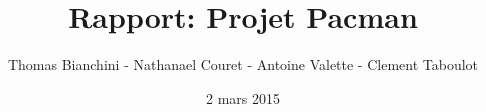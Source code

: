 \documentclass{article}
\author{Thomas Bianchini - Nathanael Couret - Antoine Valette - Clement Taboulot}
\title{Rapport: \linebreak Projet Pacman}
\date{2 mars 2015}
\begin{document}
\maketitle

\pagebreak

\tableofcontents

\pagebreak






\end{document}
